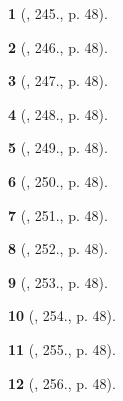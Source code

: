 \documentclass{article}
\newtheorem{baitoan}{}
\begin{document}
\begin{baitoan}[\cite{Binh_Toan_8_tap_1}, 245., p. 48]
	
\end{baitoan}

\begin{baitoan}[\cite{Binh_Toan_8_tap_1}, 246., p. 48]
	
\end{baitoan}

\begin{baitoan}[\cite{Binh_Toan_8_tap_1}, 247., p. 48]
	
\end{baitoan}

\begin{baitoan}[\cite{Binh_Toan_8_tap_1}, 248., p. 48]
	
\end{baitoan}

\begin{baitoan}[\cite{Binh_Toan_8_tap_1}, 249., p. 48]
	
\end{baitoan}

\begin{baitoan}[\cite{Binh_Toan_8_tap_1}, 250., p. 48]
	
\end{baitoan}

\begin{baitoan}[\cite{Binh_Toan_8_tap_1}, 251., p. 48]
	
\end{baitoan}

\begin{baitoan}[\cite{Binh_Toan_8_tap_1}, 252., p. 48]
	
\end{baitoan}

\begin{baitoan}[\cite{Binh_Toan_8_tap_1}, 253., p. 48]
	
\end{baitoan}

\begin{baitoan}[\cite{Binh_Toan_8_tap_1}, 254., p. 48]
	
\end{baitoan}

\begin{baitoan}[\cite{Binh_Toan_8_tap_1}, 255., p. 48]
	
\end{baitoan}

\begin{baitoan}[\cite{Binh_Toan_8_tap_1}, 256., p. 48]
	
\end{baitoan}
\end{document}
